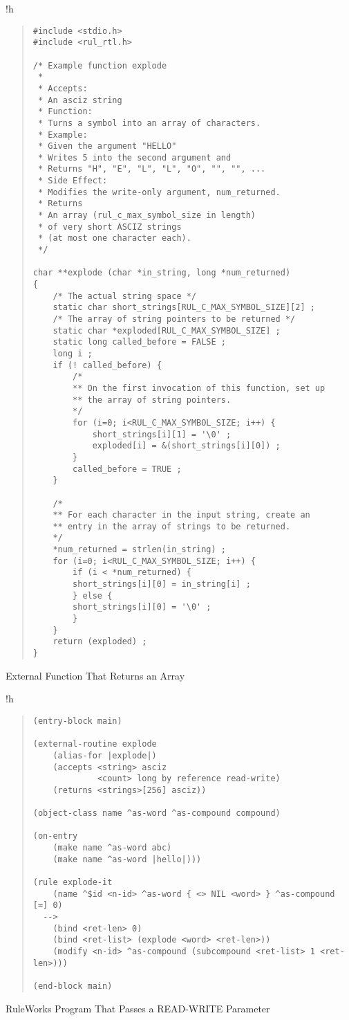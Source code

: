 \begin{example}{!h}
\begin{quote}
\begin{verbatim}
#include <stdio.h>
#include <rul_rtl.h>

/* Example function explode
 *
 * Accepts:
 * An asciz string
 * Function:
 * Turns a symbol into an array of characters.
 * Example:
 * Given the argument "HELLO"
 * Writes 5 into the second argument and
 * Returns "H", "E", "L", "L", "O", "", "", ...
 * Side Effect:
 * Modifies the write-only argument, num_returned.
 * Returns
 * An array (rul_c_max_symbol_size in length)
 * of very short ASCIZ strings
 * (at most one character each).
 */

char **explode (char *in_string, long *num_returned)
{
    /* The actual string space */
    static char short_strings[RUL_C_MAX_SYMBOL_SIZE][2] ;
    /* The array of string pointers to be returned */
    static char *exploded[RUL_C_MAX_SYMBOL_SIZE] ;
    static long called_before = FALSE ;
    long i ;
    if (! called_before) {
        /*
        ** On the first invocation of this function, set up
        ** the array of string pointers.
        */
        for (i=0; i<RUL_C_MAX_SYMBOL_SIZE; i++) {
            short_strings[i][1] = '\0' ;
            exploded[i] = &(short_strings[i][0]) ;
        }
        called_before = TRUE ;
    }

    /*
    ** For each character in the input string, create an
    ** entry in the array of strings to be returned.
    */
    *num_returned = strlen(in_string) ;
    for (i=0; i<RUL_C_MAX_SYMBOL_SIZE; i++) {
        if (i < *num_returned) {
        short_strings[i][0] = in_string[i] ;
        } else {
        short_strings[i][0] = '\0' ;
        }
    }
    return (exploded) ;
}
\end{verbatim}
\end{quote}
\caption{External Function That Returns an Array}
\label{e:6-5}
\end{example}


\begin{example}{!h}
\begin{quote}
\begin{verbatim}
(entry-block main)

(external-routine explode
    (alias-for |explode|)
    (accepts <string> asciz
             <count> long by reference read-write)
    (returns <strings>[256] asciz))
 
(object-class name ^as-word ^as-compound compound)

(on-entry
    (make name ^as-word abc)
    (make name ^as-word |hello|)))

(rule explode-it
    (name ^$id <n-id> ^as-word { <> NIL <word> } ^as-compound [=] 0)
  -->
    (bind <ret-len> 0)
    (bind <ret-list> (explode <word> <ret-len>))
    (modify <n-id> ^as-compound (subcompound <ret-list> 1 <ret-len>)))

(end-block main)
\end{verbatim}
\end{quote}
\caption{RuleWorks Program That Passes a READ-WRITE Parameter}
\label{e:6-6}
\end{example}

